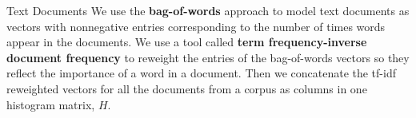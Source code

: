 \documentclass[final]{beamer}
\newlength{\onecolwid}
\begin{document}
\begin{frame}[t]
\begin{columns}[t]
\begin{column}{\onecolwid}
\begin{block}{Text Documents}
We use the \textbf{bag-of-words} approach to model text documents as vectors with nonnegative entries corresponding to the number of times words appear in the documents.
We use a tool called \textbf{term frequency-inverse document frequency} to reweight the entries of the bag-of-words vectors so they reflect the importance of a word in a document. Then we concatenate the tf-idf reweighted vectors for all the documents from a corpus as columns in one histogram matrix, $H$.






\end{block}



\end{column}
\end{columns}
\end{frame}
\end{document}
